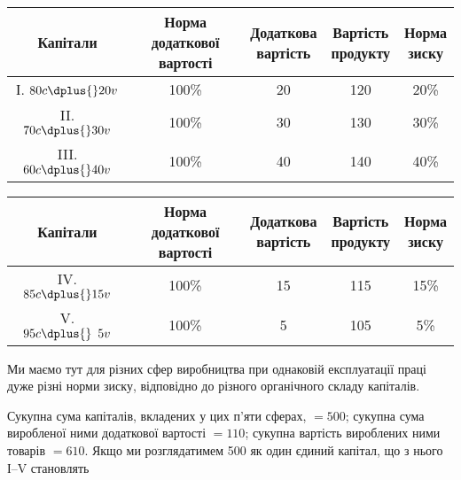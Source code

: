 \begin{table}[H]
\centering
  \begin{tabular}{c c c c c}
  \toprule
Капітали  &  \makecell{Норма додаткової\\вартості}  & \makecell{Додаткова \\вартість} & \makecell{Вартість\\продукту} & \makecell{Норма\\зиску}\\
  \midrule
  \phantom{II}І. $80 c \dplus{} 20 v$          &  100\% &   20            &  120 &   20\% \\
  \phantom{I}II. $70 c \dplus{} 30 v$          &  100\% &   30            &  130 &   30\% \\
  III. $60 c \dplus{} 40 v$                    &  100\% &   40            &  140 &   40\% \\
  \end{tabular}
\end{table}

\begin{table}[H]
\centering
  \begin{tabular}{c c c c c}
  \toprule
Капітали  &  \makecell{Норма додаткової\\вартості}  & \makecell{Додаткова \\вартість} & \makecell{Вартість\\продукту} & \makecell{Норма\\зиску}\\
  \midrule
  IV. $85 c \dplus{} 15 v$                     &  100\% &   15            &  115 &   15\% \\
  \phantom{I}V. $95 c \dplus{} \phantom{0}5 v$ &  100\% &   \phantom{0}5  &  105 &   \phantom{0}5\% \\
  \end{tabular}
\end{table}

\noindent{}Ми маємо тут для різних сфер виробництва при однаковій
експлуатації праці дуже різні норми зиску, відповідно до різного органічного складу капіталів.

Сукупна сума капіталів, вкладених у цих п’яти сферах, $= 500$;
сукупна сума виробленої ними додаткової вартості $= 110$; сукупна вартість вироблених ними товарів $=
610$. Якщо ми розглядатимем 500 як один єдиний капітал, що з нього І--V становлять
\parbreak{}  %
